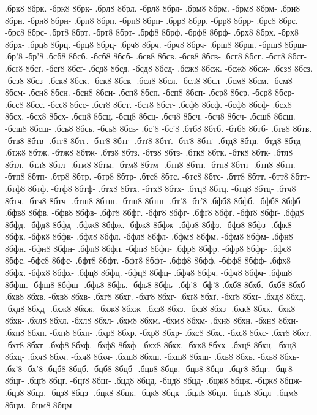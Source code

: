 {.брк8 8брк. -брк8 8брк-
.брл8 8брл. -брл8 8брл-
.брм8 8брм. -брм8 8брм-
.брн8 8брн. -брн8 8брн-
.брп8 8брп. -брп8 8брп-
.брр8 8брр. -брр8 8брр-
.брс8 8брс. -брс8 8брс-
.брт8 8брт. -брт8 8брт-
.брф8 8брф. -брф8 8брф-
.брх8 8брх. -брх8 8брх-
.брц8 8брц. -брц8 8брц-
.брч8 8брч. -брч8 8брч-
.брш8 8брш. -брш8 8брш-
.бр'8 -бр'8
.бсб8 8бсб. -бсб8 8бсб-
.бсв8 8бсв. -бсв8 8бсв-
.бсг8 8бсг. -бсг8 8бсг-
.бсґ8 8бсґ. -бсґ8 8бсґ-
.бсд8 8бсд. -бсд8 8бсд-
.бсж8 8бсж. -бсж8 8бсж-
.бсз8 8бсз. -бсз8 8бсз-
.бск8 8бск. -бск8 8бск-
.бсл8 8бсл. -бсл8 8бсл-
.бсм8 8бсм. -бсм8 8бсм-
.бсн8 8бсн. -бсн8 8бсн-
.бсп8 8бсп. -бсп8 8бсп-
.бср8 8бср. -бср8 8бср-
.бсс8 8бсс. -бсс8 8бсс-
.бст8 8бст. -бст8 8бст-
.бсф8 8бсф. -бсф8 8бсф-
.бсх8 8бсх. -бсх8 8бсх-
.бсц8 8бсц. -бсц8 8бсц-
.бсч8 8бсч. -бсч8 8бсч-
.бсш8 8бсш. -бсш8 8бсш-
.бсь8 8бсь. -бсь8 8бсь-
.бс'8 -бс'8
.бтб8 8бтб. -бтб8 8бтб-
.бтв8 8бтв. -бтв8 8бтв-
.бтг8 8бтг. -бтг8 8бтг-
.бтґ8 8бтґ. -бтґ8 8бтґ-
.бтд8 8бтд. -бтд8 8бтд-
.бтж8 8бтж. -бтж8 8бтж-
.бтз8 8бтз. -бтз8 8бтз-
.бтк8 8бтк. -бтк8 8бтк-
.бтл8 8бтл. -бтл8 8бтл-
.бтм8 8бтм. -бтм8 8бтм-
.бтн8 8бтн. -бтн8 8бтн-
.бтп8 8бтп. -бтп8 8бтп-
.бтр8 8бтр. -бтр8 8бтр-
.бтс8 8бтс. -бтс8 8бтс-
.бтт8 8бтт. -бтт8 8бтт-
.бтф8 8бтф. -бтф8 8бтф-
.бтх8 8бтх. -бтх8 8бтх-
.бтц8 8бтц. -бтц8 8бтц-
.бтч8 8бтч. -бтч8 8бтч-
.бтш8 8бтш. -бтш8 8бтш-
.бт'8 -бт'8
.бфб8 8бфб. -бфб8 8бфб-
.бфв8 8бфв. -бфв8 8бфв-
.бфг8 8бфг. -бфг8 8бфг-
.бфґ8 8бфґ. -бфґ8 8бфґ-
.бфд8 8бфд. -бфд8 8бфд-
.бфж8 8бфж. -бфж8 8бфж-
.бфз8 8бфз. -бфз8 8бфз-
.бфк8 8бфк. -бфк8 8бфк-
.бфл8 8бфл. -бфл8 8бфл-
.бфм8 8бфм. -бфм8 8бфм-
.бфн8 8бфн. -бфн8 8бфн-
.бфп8 8бфп. -бфп8 8бфп-
.бфр8 8бфр. -бфр8 8бфр-
.бфс8 8бфс. -бфс8 8бфс-
.бфт8 8бфт. -бфт8 8бфт-
.бфф8 8бфф. -бфф8 8бфф-
.бфх8 8бфх. -бфх8 8бфх-
.бфц8 8бфц. -бфц8 8бфц-
.бфч8 8бфч. -бфч8 8бфч-
.бфш8 8бфш. -бфш8 8бфш-
.бфь8 8бфь. -бфь8 8бфь-
.бф'8 -бф'8
.бхб8 8бхб. -бхб8 8бхб-
.бхв8 8бхв. -бхв8 8бхв-
.бхг8 8бхг. -бхг8 8бхг-
.бхґ8 8бхґ. -бхґ8 8бхґ-
.бхд8 8бхд. -бхд8 8бхд-
.бхж8 8бхж. -бхж8 8бхж-
.бхз8 8бхз. -бхз8 8бхз-
.бхк8 8бхк. -бхк8 8бхк-
.бхл8 8бхл. -бхл8 8бхл-
.бхм8 8бхм. -бхм8 8бхм-
.бхн8 8бхн. -бхн8 8бхн-
.бхп8 8бхп. -бхп8 8бхп-
.бхр8 8бхр. -бхр8 8бхр-
.бхс8 8бхс. -бхс8 8бхс-
.бхт8 8бхт. -бхт8 8бхт-
.бхф8 8бхф. -бхф8 8бхф-
.бхх8 8бхх. -бхх8 8бхх-
.бхц8 8бхц. -бхц8 8бхц-
.бхч8 8бхч. -бхч8 8бхч-
.бхш8 8бхш. -бхш8 8бхш-
.бхь8 8бхь. -бхь8 8бхь-
.бх'8 -бх'8
.бцб8 8бцб. -бцб8 8бцб-
.бцв8 8бцв. -бцв8 8бцв-
.бцг8 8бцг. -бцг8 8бцг-
.бцґ8 8бцґ. -бцґ8 8бцґ-
.бцд8 8бцд. -бцд8 8бцд-
.бцж8 8бцж. -бцж8 8бцж-
.бцз8 8бцз. -бцз8 8бцз-
.бцк8 8бцк. -бцк8 8бцк-
.бцл8 8бцл. -бцл8 8бцл-
.бцм8 8бцм. -бцм8 8бцм-
}
